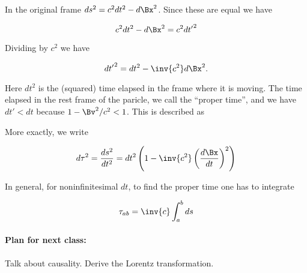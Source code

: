 In the original frame $ds^2 = c^2 dt^2 - d\Bx^2$.  Since these are equal we have

\begin{equation}\label{eqn:relativisticElectrodynamicsL3:110}
c^2 dt^2 - d\Bx^2 = c^2 {dt'}^2
\end{equation}

Dividing by $c^2$ we have

\begin{equation}\label{eqn:relativisticElectrodynamicsL3:115}
{dt'}^2 = dt^2 - \inv{c^2} d\Bx^2 .
\end{equation}

Here $dt^2$ is the (squared) time elapsed in the frame where it is moving.  The time elapsed in the rest frame of the paricle, we call the ``proper time'', and we have $dt' < dt$ because $1 - \Bv^2/c^2 < 1$.  This is described as

More exactly, we write 

\begin{equation}\label{eqn:relativisticElectrodynamicsL3:120}
d\tau^2 = \frac{ds^2}{dt^2} = dt^2 \left( 1 - \inv{c^2} \left(\frac{d\Bx}{dt}\right)^2 \right)
\end{equation}

In general, for noninfinitesimal $dt$, to find the proper time one has to integrate 

\begin{equation}\label{eqn:relativisticElectrodynamicsL3:130}
\tau_{ab} = \inv{c} \int_a^b ds
\end{equation}

\paragraph{Plan for next class:}  Talk about causality.  Derive the Lorentz transformation.

\EndArticle
